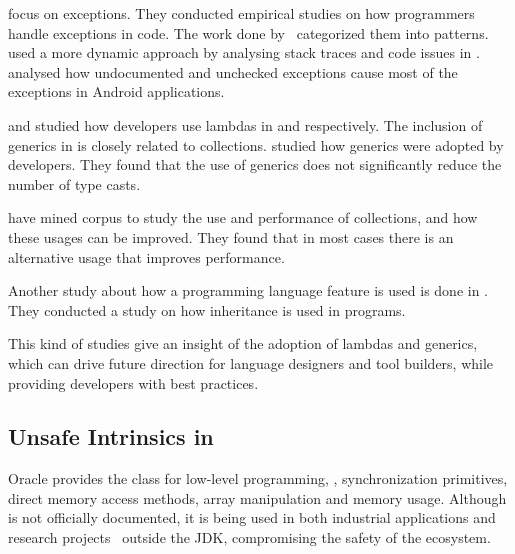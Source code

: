 \cite{keryExaminingProgrammerPractices2016,asaduzzamanHowDevelopersUse2016} focus on exceptions.
They conducted empirical studies on how programmers handle exceptions in \java{} code.
The work done by~\cite{nakshatriAnalysisExceptionHandling2016} categorized them into patterns.
\cite{coelhoUnveilingExceptionHandling2015} used a more dynamic approach by analysing stack traces and code issues in \github{}.
\cite{kechagiaUndocumentedUncheckedExceptions2014} analysed how undocumented and
unchecked exceptions cause most of the exceptions in
Android applications.

\cite{mazinanianUnderstandingUseLambda2017} and \cite{uesbeckEmpiricalStudyImpact2016} studied how developers use lambdas in \java{} and \cpp{} respectively.
The inclusion of generics in \java{} is closely related to collections. 
\cite{parninJavaGenericsAdoption2011,parninAdoptionUseJava2013} studied how generics were adopted by \java{} developers.
They found that the use of generics does not significantly reduce the number of type casts.

\cite{costaEmpiricalStudyUsage2017} have mined \github{} corpus to study the use and performance of collections,
and how these usages can be improved.
They found that in most cases there is an alternative usage that improves performance.

Another study about how a programming language feature is used is done in
\cite{temperoHowJavaPrograms2008}.
They conducted a study on how inheritance is used in \java{} programs.

This kind of studies give an insight of the adoption of lambdas and generics, which can drive future direction for language designers and tool builders, while providing developers with best practices.

\subsection{Unsafe Intrinsics in \java{}}
\label{sec:literature-review:unsafe}

Oracle provides the \smu{} class for low-level programming,
\eg{}, synchronization primitives, direct memory access methods,
array manipulation and memory usage.
Although \smu{} is not officially documented,
it is being used in both industrial applications
and research projects~\citep{korlandNoninvasiveConcurrencyJava2010,pukallFlexibleDynamicSoftware,gligoricCoDeSeFastDeserialization2011}
outside the JDK, compromising the safety of the \java{} ecosystem.


